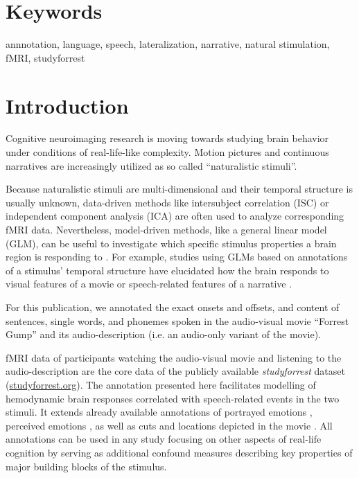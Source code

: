 \documentclass[10pt,a4paper,onecolumn]{article}
\begin{document}
\section*{Keywords}
annnotation, language, speech, lateralization, narrative, natural stimulation, fMRI, studyforrest

\listoftodos

\clearpage

\section*{Introduction}
Cognitive neuroimaging research is moving towards studying brain behavior
under conditions of real-life-like complexity. Motion pictures \citep{hasson2008neurocinematics} and continuous narratives \citep{honey2012not, lerner2011topographic} are increasingly utilized as so called ``naturalistic stimuli''.

Because naturalistic stimuli are multi-dimensional and their temporal structure
is usually unknown, data-driven methods like intersubject correlation
(ISC)\citep{hasson2004intersubject} or independent component analysis
(ICA)\citep{bartels2004chronoarchitecture} are often used to analyze
corresponding fMRI data.  Nevertheless, model-driven methods, like a general
linear model (GLM), can be useful to investigate which specific stimulus
properties a brain region is responding to \citep{hamilton2018revolution}. For
example, studies using GLMs based on annotations of a stimulus' temporal
structure have elucidated how the brain responds to visual features of a movie
\citep{bartels2004mapping} or speech-related features of a narrative
\citep{rocca2019language}.

For this publication, we annotated the exact onsets and offsets, and content of
sentences, single words, and phonemes spoken in the audio-visual movie
``Forrest Gump'' \citep{ForrestGumpMovie} and its audio-description (i.e. an
audio-only variant of the movie)\citep{ForrestGumpDVD}.

fMRI data of participants watching the audio-visual movie \citep{hanke2016simultaneous} and listening to the audio-description \citep{hanke2014audiomovie} are the core data of the publicly available \textit{studyforrest} dataset (\href{www.studyforrest.org}{studyforrest.org}).
The annotation presented here facilitates modelling of hemodynamic brain responses
correlated with speech-related events in the two stimuli.
It extends already available annotations of portrayed emotions
\citep{labs2015portrayed}, perceived emotions \citep{lettieri2019emotionotopy},
as well as cuts and locations depicted in the movie
\citep{haeusler2016annotation}.  All annotations can be used in any study
focusing on other aspects of real-life cognition by serving as additional
confound measures describing key properties of major building blocks of the
stimulus.
\end{document}
